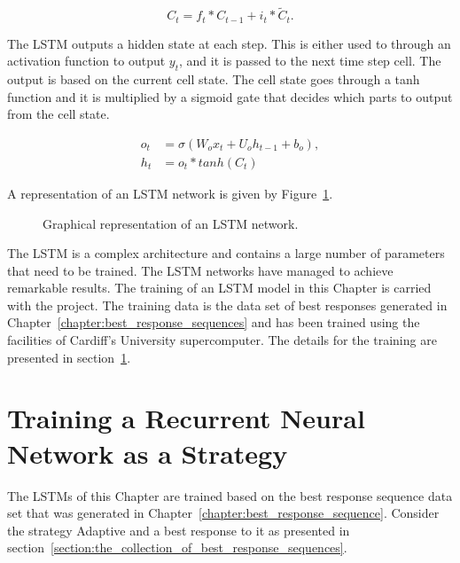 \begin{equation}\label{eq:input_gate}
    C_{t} = f_{t} * C_{t-1} + i_{t} * \tilde{C}_{t}.
\end{equation}

The LSTM outputs a hidden state at each step. This is either used to through
an activation function to output \(y_{t}\), and it is passed to the next time
step cell. The output is based on the current cell state. The cell state goes
through a tanh function and it is multiplied by a sigmoid gate that decides which
parts to output from the cell state.

\begin{align}\label{eq:input_gate}
    o_{t} & = \sigma(W_{o}x_{t} + U_{o}h_{t-1} + b_{o}), \\
    h_{t} & = o_{t} * tanh(C_{t})
\end{align}

A representation of an LSTM network is given by Figure~\ref{fig:lstm}.

\begin{figure}[!htbp]
    \centering
    
    \caption{Graphical representation of an LSTM network.}\label{fig:lstm}
\end{figure}

The LSTM is a complex architecture and contains a large number of parameters
that need to be trained. The LSTM networks have managed to achieve remarkable
results. The training of an LSTM model in this Chapter is carried with the
project. The training data is the data set of best responses generated in
Chapter~\ref{chapter:best_response_sequences} and has been trained using the
facilities of Cardiff's University supercomputer. The details for the training
are presented in section~\ref{section:training_a_rnn}.

\section{Training a Recurrent Neural Network as a Strategy}\label{section:training_a_rnn}

The LSTMs of this Chapter are trained based on the best response sequence
data set that was generated in Chapter~\ref{chapter:best_response_sequence}.
Consider the strategy Adaptive and a best response to it as presented in
section~\ref{section:the_collection_of_best_response_sequences}.

